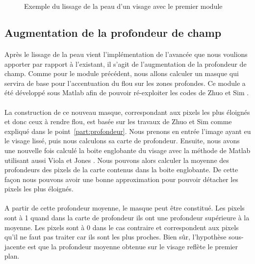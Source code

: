 \documentclass[11pt, french]{report-rd-info}
\begin{document}
\begin{figure}[htp]
 \caption{Exemple du lissage de la peau d'un visage avec le premier module}
 \label{fig:lissageExemple}
\end{figure}


\subsection{Augmentation de la profondeur de champ}
\paragraph*{}
Après le lissage de la peau vient l'implémentation de l'avancée que nous voulions apporter par rapport à l'existant, il s'agit de l'augmentation de la profondeur de champ. Comme pour le module précédent, nous allons calculer un masque qui servira de base pour l'accentuation du flou sur les zones profondes. Ce module a été développé sous Matlab afin de pouvoir ré-exploiter les codes de Zhuo et Sim \cite{Zhuo2011}.

\paragraph*{}
La construction de ce nouveau masque, correspondant aux pixels les plus éloignés et donc ceux à rendre flou, est basée sur les travaux de Zhuo et Sim \cite{Zhuo2011} comme expliqué dans le point~\ref{part:profondeur}.
Nous prenons en entrée l'image ayant eu le visage lissé, puis nous calculons sa carte de profondeur. Ensuite, nous avons une nouvelle fois calculé la boite englobante du visage avec la méthode de Matlab utilisant aussi Viola et Jones \cite{Viola2004}. Nous pouvons alors calculer la moyenne des profondeurs des pixels de la carte contenus dans la boite englobante. De cette façon nous pouvons avoir une bonne approximation pour pouvoir détacher les pixels les plus éloignés. 

\paragraph*{}
A partir de cette profondeur moyenne, le masque peut être constitué. Les pixels sont à 1 quand dans la carte de profondeur ils ont une profondeur supérieure à la moyenne. Les pixels sont à 0 dans le cas contraire et correspondent aux pixels qu'il ne faut pas traiter car ils sont les plus proches. Bien sûr, l'hypothèse sous-jacente est que la profondeur moyenne obtenue sur le visage reflète le premier plan. 
 
\end{document}
